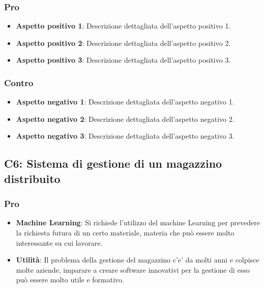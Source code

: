 \subsubsection{Pro}

\begin{itemize}
    \item \textbf{Aspetto positivo 1}: Descrizione dettagliata dell'aspetto positivo 1.
    \item \textbf{Aspetto positivo 2}: Descrizione dettagliata dell'aspetto positivo 2.
    \item \textbf{Aspetto positivo 3}: Descrizione dettagliata dell'aspetto positivo 3.
\end{itemize}

\subsubsection{Contro}

\begin{itemize}
    \item \textbf{Aspetto negativo 1}: Descrizione dettagliata dell'aspetto negativo 1.
    \item \textbf{Aspetto negativo 2}: Descrizione dettagliata dell'aspetto negativo 2.
    \item \textbf{Aspetto negativo 3}: Descrizione dettagliata dell'aspetto negativo 3.
\end{itemize}


\subsection{C6: Sistema di gestione di un magazzino distribuito}

\subsubsection{Pro}

\begin{itemize}
    \item \textbf{Machine Learning}: Si richiede l'utilizzo del machine Learning per prevedere la richiesta futura di un certo materiale, materia che può essere molto interessante su cui lavorare.
    \item \textbf{Utilità}: Il problema della gestione del magazzino c’e’ da molti anni e colpisce molte aziende, imparare a creare software innovativi per la gestione di esso può essere molto utile e formativo.
\end{itemize}

